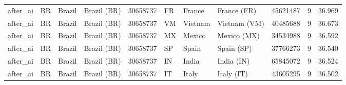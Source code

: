 \begin{tabular}{llllrlllrrr}
after\_ai & BR & Brazil & Brazil (BR) & 30658737 & FR & France & France (FR) & 45621487 & 9 & 36.969 \\
after\_ai & BR & Brazil & Brazil (BR) & 30658737 & VM & Vietnam & Vietnam (VM) & 40485688 & 9 & 36.673 \\
after\_ai & BR & Brazil & Brazil (BR) & 30658737 & MX & Mexico & Mexico (MX) & 34534988 & 9 & 36.592 \\
after\_ai & BR & Brazil & Brazil (BR) & 30658737 & SP & Spain & Spain (SP) & 37766273 & 9 & 36.540 \\
after\_ai & BR & Brazil & Brazil (BR) & 30658737 & IN & India & India (IN) & 65845072 & 9 & 36.524 \\
after\_ai & BR & Brazil & Brazil (BR) & 30658737 & IT & Italy & Italy (IT) & 43605295 & 9 & 36.502 \\
\bottomrule
\end{tabular}
